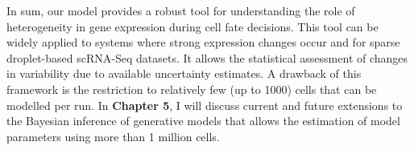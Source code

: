 In sum, our model provides a robust tool for understanding the role of heterogeneity in gene expression during cell fate decisions. This tool can be widely applied to systems where strong expression changes occur and for sparse droplet-based scRNA-Seq datasets. It allows the statistical assessment of changes in variability due to available uncertainty estimates. A drawback of this framework is the restriction to relatively few (up to 1000) cells that can be modelled per run. In \textbf{Chapter 5}, I will discuss current and future extensions to the Bayesian inference of generative models that allows the estimation of model parameters using more than 1 million cells.


